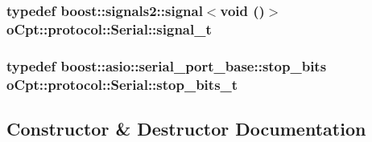 \subsubsection[{\texorpdfstring{signal\+\_\+t}{signal_t}}]{\setlength{\rightskip}{0pt plus 5cm}typedef boost\+::signals2\+::signal$<$void ()$>$ {\bf o\+Cpt\+::protocol\+::\+Serial\+::signal\+\_\+t}}\hypertarget{classo_cpt_1_1protocol_1_1_serial_ad6b50eec67a064c4a2eb34d3ac605ffb}{}\label{classo_cpt_1_1protocol_1_1_serial_ad6b50eec67a064c4a2eb34d3ac605ffb}
\subsubsection[{\texorpdfstring{stop\+\_\+bits\+\_\+t}{stop_bits_t}}]{\setlength{\rightskip}{0pt plus 5cm}typedef boost\+::asio\+::serial\+\_\+port\+\_\+base\+::stop\+\_\+bits {\bf o\+Cpt\+::protocol\+::\+Serial\+::stop\+\_\+bits\+\_\+t}}\hypertarget{classo_cpt_1_1protocol_1_1_serial_aadc4c803ade35920211e6c6a202a8c1f}{}\label{classo_cpt_1_1protocol_1_1_serial_aadc4c803ade35920211e6c6a202a8c1f}


\subsection{Constructor \& Destructor Documentation}
